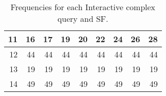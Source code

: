 \begin{table}[htb]
\begin{tabular}{|r|r|r|r|r|r|r|r|r|}
        11             & 16           & 17           & 19            & 20            & 22             & 24             & 26                         & 28                         \\\hline
        12             & 44           & 44           & 44            & 44            & 44             & 44             & 44                         & 44                         \\\hline
        13             & 19           & 19           & 19            & 19            & 19             & 19             & 19                         & 19                         \\\hline
        14             & 49           & 49           & 49            & 49            & 49             & 49             & 49                         & 49                         \\\hline
    \end{tabular}
    \caption{Frequencies for each Interactive complex query and SF.}
    \label{table:freqs}
\end{table}
